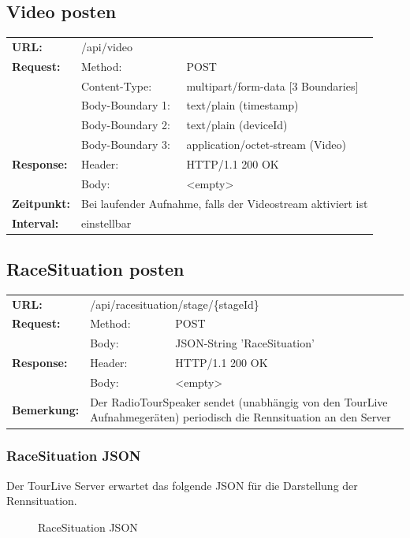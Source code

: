 \subsection{Video posten}
\begin{longtable}{ p{2.5cm} p{3.5cm} p{6cm}}
	\textbf{URL:} & \multicolumn{2}{p{10cm}}{/api/video} \\
	\textbf{Request:} & Method: & POST \\
		& Content-Type: & multipart/form-data [3 Boundaries] \\
		& Body-Boundary 1: & text/plain (timestamp) \\
		& Body-Boundary 2: & text/plain (deviceId) \\
		& Body-Boundary 3: & application/octet-stream (Video) \\
	\textbf{Response:} & Header: & HTTP/1.1 200 OK \\
		& Body: & <empty> \\
	\textbf{Zeitpunkt:} & \multicolumn{2}{p{10cm}}{Bei laufender Aufnahme, falls der Videostream aktiviert ist} \\ 
	\textbf{Interval:} & \multicolumn{2}{p{10cm}}{einstellbar} 
\end{longtable}

\subsection{RaceSituation posten}
\begin{longtable}{ p{2.5cm} p{3.5cm} p{6cm}}
	\textbf{URL:} & \multicolumn{2}{p{10cm}}{/api/racesituation/stage/\{stageId\}} \\
	\textbf{Request:} & Method: & POST \\
		& Body: & JSON-String 'RaceSituation'\\	
	\textbf{Response:} & Header: & HTTP/1.1 200 OK \\
		& Body: & <empty> \\	
	\textbf{Bemerkung:} & \multicolumn{2}{p{10cm}}{Der RadioTourSpeaker sendet (unabhängig von den TourLive Aufnahmegeräten) periodisch die Rennsituation an den Server}
\end{longtable}

\subsubsection{RaceSituation JSON}
Der TourLive Server erwartet das folgende JSON für die Darstellung der Rennsituation.
\begin{figure}[H]
	\centering
	
	\caption{RaceSituation JSON}
\end{figure}


